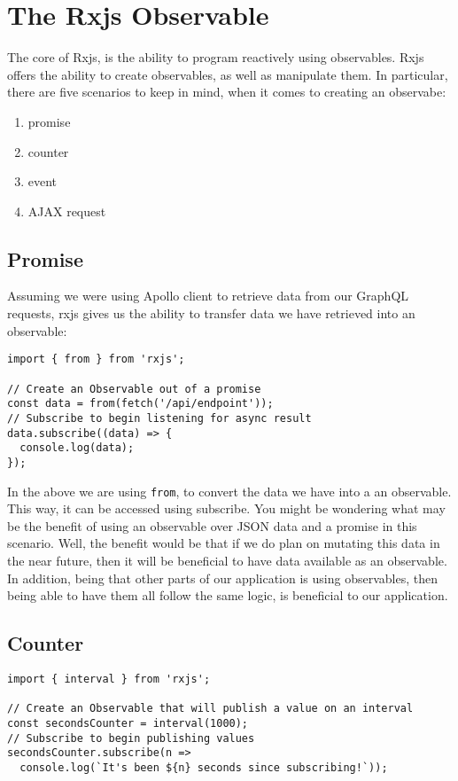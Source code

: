 \section{ The Rxjs Observable }
The core of Rxjs, is the ability to program reactively using observables. Rxjs 
offers the ability to create observables, as well as manipulate them. In 
particular, there are five scenarios to keep in mind, when it comes to creating
an observabe: 
\begin{enumerate}
  \item promise
  \item counter
  \item event
  \item AJAX request
\end{enumerate}

\subsection{ Promise }
Assuming we were using Apollo client to retrieve data from our GraphQL 
requests, rxjs gives us the ability to transfer data we have retrieved into an
observable: 
\begin{lstlisting}
import { from } from 'rxjs';

// Create an Observable out of a promise
const data = from(fetch('/api/endpoint'));
// Subscribe to begin listening for async result
data.subscribe((data) => {
  console.log(data);
});  
\end{lstlisting}

In the above we are using \lstinline{from}, to convert the data we have into a 
an observable. This way, it can be accessed using subscribe. You might be 
wondering what may be the benefit of using an observable over JSON data and 
a promise in this scenario. Well, the benefit would be that if we do plan on 
mutating this data in the near future, then it will be beneficial to have data
available as an observable. In addition, being that other parts of our 
application is using observables, then being able to have them all follow 
the same logic, is beneficial to our application. 

\subsection{Counter}
\begin{lstlisting}
import { interval } from 'rxjs';

// Create an Observable that will publish a value on an interval
const secondsCounter = interval(1000);
// Subscribe to begin publishing values
secondsCounter.subscribe(n =>
  console.log(`It's been ${n} seconds since subscribing!`));
\end{lstlisting}


